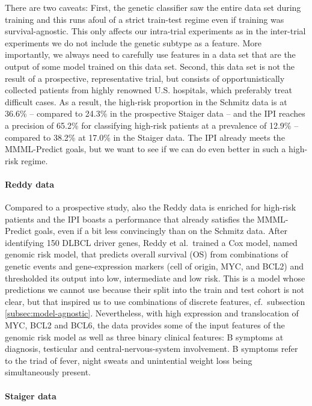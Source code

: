 There are two caveats: First, the genetic classifier saw the entire data set during training and 
this runs afoul of a strict train-test regime even if training was 
survival-agnostic. This only affects our intra-trial experiments as in the inter-trial experiments 
we do not include the genetic subtype as a feature. More importantly, we always need 
to carefully use features in a data set that are the output of some model trained on this data set. 
Second, this data set is not the result of a 
prospective, representative trial, but consists of opportunistically collected patients from highly renowned 
U.S. hospitals, which preferably treat 
difficult cases. As a result, the high-risk proportion in the Schmitz data is at \num{36.6}\% -- 
compared to \num{24.3}\% in the prospective Staiger data -- and the IPI reaches a precision of 
\num{65.2}\% for classifying high-risk patients at a prevalence of \num{12.9}\% -- compared to 
\num{38.2}\% at \num{17.0}\% in the Staiger data. The IPI already meets the MMML-Predict goals, 
but we want to see if we can do even better in such a high-risk regime.

\paragraph{Reddy data}

Compared to a prospective study, also the Reddy data is enriched for high-risk patients and the 
IPI boasts a performance that already satisfies the MMML-Predict goals, even if a bit less 
convincingly than on the Schmitz data. After identifying \num{150} DLBCL driver genes, Reddy et al.\ 
trained a Cox model, named genomic risk model,
that predicts overall survival (OS) from combinations of genetic events and gene-expression markers 
(cell of origin, MYC, and BCL2) and thresholded its output into low, intermediate and low risk. This is a
model whose predictions we cannot use because their split into the train and test cohort is not 
clear, but that inspired us to use combinations of discrete features, cf.\ subsection 
\ref{subsec:model-agnostic}. Nevertheless, with high expression and translocation of MYC, BCL2 and 
BCL6, the data provides some of the input features of the genomic risk model as well as three binary 
clinical features: B symptoms at diagnosis, testicular and central-nervous-system involvement. B 
symptoms refer to the triad of fever, night sweats and unintential weight 
loss being simultaneously present.

\paragraph{Staiger data}

